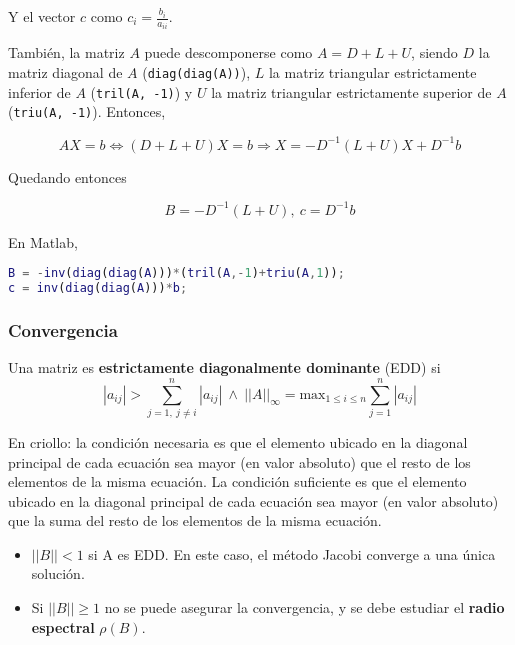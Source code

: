 \documentclass{article}
\begin{document}
Y el vector $c$ como $c_i = \frac{b_i}{a_{ii}}$.

También, la matriz $A$ puede descomponerse como $A=D+L+U$, siendo $D$ la matriz 
diagonal de $A$ (\verb|diag(diag(A))|), $L$ la matriz triangular estrictamente 
inferior de $A$ (\verb|tril(A, -1)|) y $U$ la matriz triangular estrictamente 
superior de $A$ (\verb|triu(A, -1)|). Entonces,

\begin{equation}\label{eq:jacobi_vec}
    AX = b \Longleftrightarrow (D+L+U)X = b \Longrightarrow X = -D^{-1}(L+U)X + D^{-1}b
\end{equation}

Quedando entonces

\begin{equation*}
    B = -D^{-1}(L+U),\ c = D^{-1}b
\end{equation*}

En Matlab,

\begin{lstlisting}[language=Matlab]
B = -inv(diag(diag(A)))*(tril(A,-1)+triu(A,1));
c = inv(diag(diag(A)))*b;
\end{lstlisting}

\subsubsection{Convergencia}

Una matriz es \textbf{estrictamente diagonalmente dominante} (EDD) si
\begin{equation*}
    \left|a_{ij}\right| > \sum_{j=1,\ j\neq i}^{n}\left|a_{ij}\right|\ \land\ \left|\left|A\right|\right|_\infty = \text{max}_{1\leq i\leq n} \sum_{j=1}^{n}\left|a_{ij}\right|
\end{equation*}

En criollo: la condición necesaria es que el elemento ubicado en la diagonal 
principal de cada ecuación sea mayor (en valor absoluto) que el resto de los 
elementos de la misma ecuación. La condición suficiente es que el elemento 
ubicado en la diagonal principal de cada ecuación sea mayor (en valor absoluto) 
que la suma del resto de los elementos de la misma ecuación.

\begin{itemize}
    \item $||B||<1$ si A es EDD. En este caso, el método Jacobi converge a una 
        única solución.
    \item Si $||B||\geq1$ no se puede asegurar la convergencia, y se debe 
        estudiar el \textbf{radio espectral} $\rho(B)$.
\end{itemize}
\end{document}
